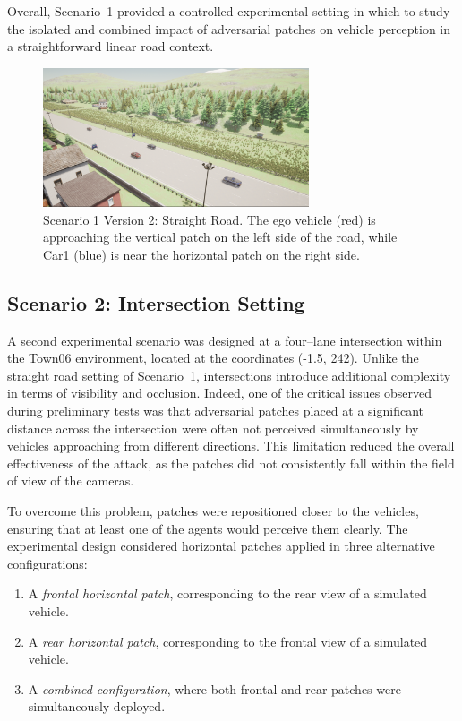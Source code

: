 Overall, Scenario~1 provided a controlled experimental setting in which to study the isolated and combined impact of adversarial patches on vehicle perception in a straightforward linear road context.

\begin{figure}
    \centering
    \includegraphics[width=0.7\textwidth]{figures/experiments/scenario1_v2.png}
    \caption{Scenario 1 Version 2: Straight Road. The ego vehicle (red) is approaching the vertical patch on the left side of the road, while Car1 (blue) is near the horizontal patch on the right side.}
    \label{fig:scenario_straight_road_v2}
\end{figure}

\subsection{Scenario 2: Intersection Setting}
\label{subsec:scenario2}

A second experimental scenario was designed at a four–lane intersection within the Town06 environment, located at the coordinates (-1.5, 242).
Unlike the straight road setting of Scenario~1, intersections introduce additional complexity in terms of visibility and occlusion. Indeed, one of the critical issues observed during preliminary tests was that adversarial patches placed at a significant distance across the intersection were often not perceived simultaneously by vehicles approaching from different directions. This limitation reduced the overall effectiveness of the attack, as the patches did not consistently fall within the field of view of the cameras.  

To overcome this problem, patches were repositioned closer to the vehicles, ensuring that at least one of the agents would perceive them clearly. The experimental design considered horizontal patches applied in three alternative configurations:  
\begin{enumerate}
    \item A \textit{frontal horizontal patch}, corresponding to the rear view of a simulated vehicle.  
    \item A \textit{rear horizontal patch}, corresponding to the frontal view of a simulated vehicle.  
    \item A \textit{combined configuration}, where both frontal and rear patches were simultaneously deployed.  
\end{enumerate}

